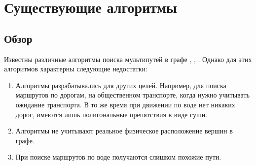 \chapter{Существующие алгоритмы}

\section{Обзор}
Известны различные алгоритмы поиска мультипутей в графе
\cite{Hyperstar}, \cite{Hyunmyung}, \cite{Dial}. Однако для этих алгоритмов характерны следующие
недостатки: 
\begin{enumerate}
    \item Алгоритмы разрабатывались для других целей. Например, для поиска
      маршрутов по дорогам, на общественном транспорте, когда нужно
      учитывать ожидание транспорта. В то же время при движении по
      воде нет никаких дорог, имеются лишь полигональные препятствия в
      виде суши.
    \item Алгоритмы не учитывают реальное физическое расположение
      вершин в графе.
    \item При поиске маршрутов по воде получаются слишком похожие пути.
\end{enumerate}

\FloatBarrier

